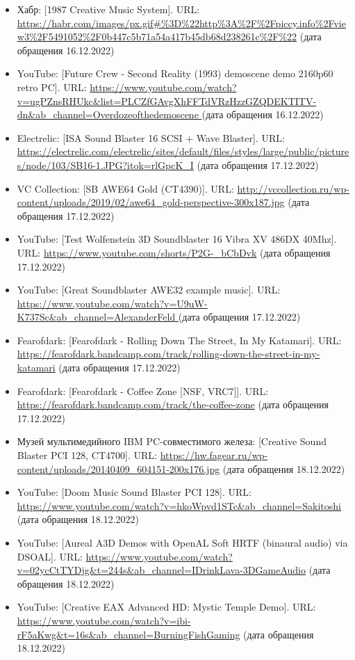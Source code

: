 \documentclass[a4paper,12pt]{extarticle}
\begin{document}
\begin{enumerate}[label=\textbf{\arabic*}]
\begin{itemize}
			\item Хабр: [1987 Creative Music System]. URL: \url{https://habr.com/images/px.gif#%3D%22http%3A%2F%2Fpiccy.info%2Fview3%2F5491052%2F0b447c5b71a54a417b45db68d238261c%2F%22} (дата обращения 16.12.2022)
			\item YouTube: [Future Crew - Second Reality (1993) demoscene demo 2160p60 retro PC]. URL: \url{https://www.youtube.com/watch?v=ugPZnsRHUkc&list=PLCZfGAvgXhFFTdVRzHzzGZQDEKTITV-dn&ab_channel=Overdozeofthedemoscene
			} (дата обращения 16.12.2022)
		
			\item Electrelic: [ISA Sound Blaster 16 SCSI + Wave Blaster]. URL: \url{https://electrelic.com/electrelic/sites/default/files/styles/large/public/pictures/node/103/SB16-1.JPG?itok=rlGpcK_I} (дата обращения 17.12.2022)
			\item VC Collection: [SB AWE64 Gold (CT4390)]. URL: \url{http://vccollection.ru/wp-content/uploads/2019/02/awe64_gold-perspective-300x187.jpg} (дата обращения 17.12.2022)
			\item YouTube: [Test Wolfenstein 3D Soundblaster 16 Vibra XV 486DX 40Mhz]. URL: \url{https://www.youtube.com/shorts/P2G-_bCbDvk} (дата обращения 17.12.2022)
			\item YouTube: [Great Soundblaster AWE32 example music]. URL: \url{https://www.youtube.com/watch?v=U9uW-K737Sc&ab_channel=AlexanderFeld
			} (дата обращения 17.12.2022)
		
			\item Fearofdark: [Fearofdark - Rolling Down The Street, In My Katamari]. URL: \url{https://fearofdark.bandcamp.com/track/rolling-down-the-street-in-my-katamari} (дата обращения 17.12.2022)
			\item Fearofdark: [Fearofdark - Coffee Zone [NSF, VRC7]]. URL: \url{https://fearofdark.bandcamp.com/track/the-coffee-zone} (дата обращения 17.12.2022)
			
			\item Музей мультимедийного IBM PC-совместимого железа: [Creative Sound Blaster PCI 128, CT4700]. URL: \url{https://hw.fagear.ru/wp-content/uploads/20140409_604151-200x176.jpg} (дата обращения 18.12.2022)
			\item YouTube: [Doom Music Sound Blaster PCI 128]. URL: \url{https://www.youtube.com/watch?v=hkoWpvd1STc&ab_channel=Sakitoshi} (дата обращения 18.12.2022)
			
			\item YouTube: [Aureal A3D Demos with OpenAL Soft HRTF (binaural audio) via DSOAL]. URL: \url{https://www.youtube.com/watch?v=02ycCtTYDjg&t=244s&ab_channel=IDrinkLava-3DGameAudio} (дата обращения 18.12.2022)
			\item YouTube: [Creative EAX Advanced HD: Mystic Temple Demo]. URL: \url{https://www.youtube.com/watch?v=ibi-rF5aKwg&t=16s&ab_channel=BurningFishGaming} (дата обращения 18.12.2022)
			

\end{itemize}
\end{enumerate}
\end{document}
